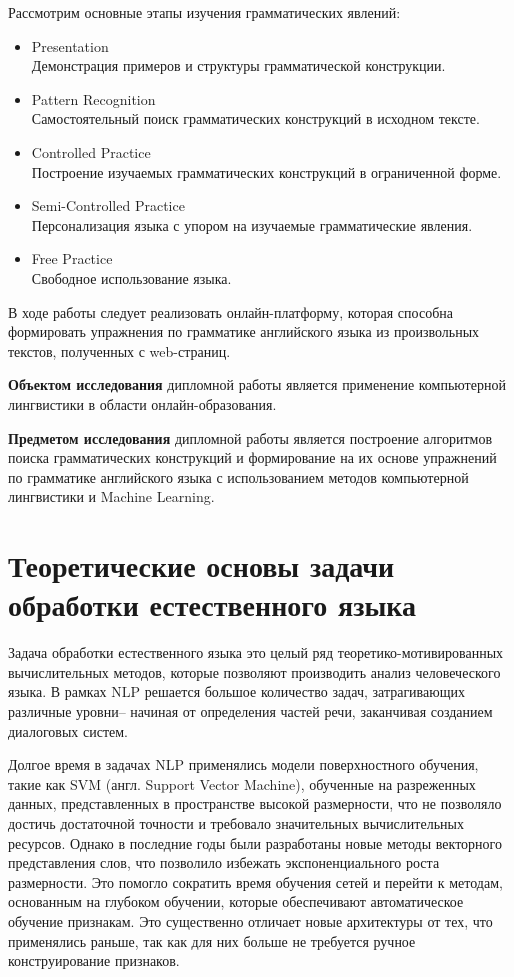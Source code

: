 Рассмотрим основные этапы изучения грамматических явлений:

\begin{itemize}
  \item Presentation \\ Демонстрация примеров и структуры грамматической конструкции.
  \item Pattern Recognition\\Самостоятельный поиск грамматических конструкций в исходном тексте.
 \item Controlled Practice\\Построение изучаемых грамматических конструкций в ограниченной форме.
 \item Semi-Controlled Practice\\Персонализация языка с упором на изучаемые грамматические явления.
 \item Free Practice\\Свободное использование языка.
\end{itemize}

В ходе работы следует реализовать онлайн-платформу, которая способна формировать упражнения по грамматике английского языка из произвольных текстов, полученных с web-страниц.

\textbf{Объектом исследования} дипломной работы является применение компьютерной лингвистики в области онлайн-образования.

\textbf{Предметом исследования} дипломной работы является построение алгоритмов поиска грамматических конструкций и формирование на их основе упражнений по грамматике английского языка с использованием методов компьютерной лингвистики и Machine Learning.

\newpage
\section{Теоретические основы задачи обработки естественного языка}
\label{sec:theory}

Задача обработки естественного языка это целый ряд теоретико-мотивированных вычислительных методов, которые позволяют производить анализ человеческого языка. В рамках NLP решается большое количество задач, затрагивающих различные уровни-- начиная от определения частей речи, заканчивая созданием диалоговых систем.

Долгое время в задачах NLP применялись модели поверхностного обучения, такие как SVM (англ. Support Vector Machine), обученные на разреженных данных, представленных в пространстве высокой размерности, что не позволяло достичь достаточной точности и требовало значительных вычислительных ресурсов. Однако в последние годы были разработаны новые методы векторного представления слов, что позволило избежать экспоненциального роста размерности. Это помогло сократить время обучения сетей и перейти к методам, основанным на глубоком обучении, которые обеспечивают автоматическое обучение признакам. Это существенно отличает новые архитектуры от тех, что применялись раньше, так как для них больше не требуется ручное конструирование признаков.

